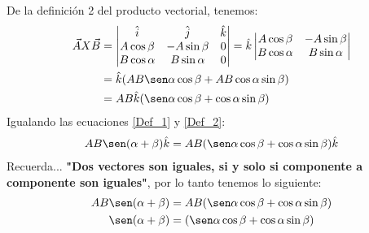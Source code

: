 \documentclass[12pt,openany]{book}
\begin{document}
				De la definici\'on 2 del producto vectorial, tenemos:\\
				\begin{equation}
					\begin{split}
						\vec{A}X\vec{B}&=\begin{vmatrix}
							   				  \hat{i}   &    \hat{j}     &  \hat{k} \\
											A\cos\beta  &  -A\sin\beta   &     0    \\
											B\cos\alpha &  B\sin\alpha   &     0    \\
										\end{vmatrix}
										=\hat{k}\begin{vmatrix}
													A\cos\beta  &  -A\sin\beta  \\
													B\cos\alpha &   B\sin\alpha \\
												\end{vmatrix}				   \\
									   &=\hat{k}(AB\sen\alpha\cos\beta+AB\cos\alpha\sin\beta) \\
									   &=AB\hat{k}(\sen\alpha\cos\beta+\cos\alpha\sin\beta)
					\end{split}
					\label{Def_2}
				\end{equation}
				Igualando las ecuaciones \ref{Def_1} y \ref{Def_2}:
				\begin{equation*}
				 	\begin{split}
				 		AB\sen(\alpha+\beta)\hat{k}&=AB(\sen\alpha\cos\beta+\cos\alpha\sin\beta)\hat{k}  \\
				 	\end{split}
				 \end{equation*}
				Recuerda... \textbf{"Dos vectores son iguales, si y solo si componente a componente son iguales"}, 
	    	    por lo tanto tenemos lo siguiente:
				\begin{equation*}
				 	\begin{split}
				 		AB\sen(\alpha+\beta)&=AB(\sen\alpha\cos\beta+\cos\alpha\sin\beta)                \\
				 		\sen(\alpha+\beta)&=(\sen\alpha\cos\beta+\cos\alpha\sin\beta)             \\
				 	\end{split}
				 \end{equation*}
\end{document}
